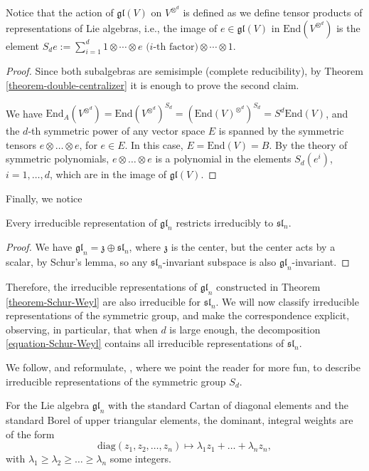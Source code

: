 Notice that the action of $\mathfrak{gl}(V)$ on $V^{\otimes^d}$ is defined as we define tensor products of representations of Lie algebras, i.e., the image of $e\in \mathfrak{gl}(V)$ in $\text{End}(V^{\otimes^d})$ is the element $S_d e:=\sum_{i=1}^d 1\otimes\cdots\otimes e \mbox{ ($i$-th factor)} \otimes \cdots\otimes 1$.

\begin{proof}
 Since both subalgebras are semisimple (complete reducibility), by Theorem \ref{theorem-double-centralizer} it is enough to prove the second claim.

 We have $\text{End}_A(V^{\otimes^d}) = \text{End}(V^{\otimes^d})^{S_d} = (\text{End}(V)^{\otimes^d})^{S_d} = S^d \text{End}(V)$, and the $d$-th symmetric power of any vector space $E$ is spanned by the symmetric tensors $e\otimes \dots \otimes e$, for $e\in E$. In this case, $E=\text{End}(V)=B$. By the theory of symmetric polynomials, $e\otimes \dots \otimes e$ is a polynomial in the elements $S_d(e^i)$, $i=1,\dots, d$, which are in the image of $\mathfrak{gl}(V)$.
\end{proof}


Finally, we notice

\begin{lemma}
\label{lemma-restriction-sl}
Every irreducible representation of $\mathfrak{gl}_n$ restricts irreducibly to $\mathfrak{sl}_n$.
\end{lemma}

\begin{proof}
 We have $\mathfrak{gl}_n = \mathfrak z \oplus \mathfrak{sl}_n$, where $\mathfrak z$ is the center, but the center acts by a scalar, by Schur's lemma, so any $\mathfrak{sl}_n$-invariant subspace is also $\mathfrak{gl}_n$-invariant.
\end{proof}

Therefore, the irreducible representations of $\mathfrak{gl}_n$ constructed in Theorem \ref{theorem-Schur-Weyl} are also irreducible for $\mathfrak{sl}_n$. We will now classify irreducible representations of the symmetric group, and make the correspondence explicit, observing, in particular, that when $d$ is large enough, the decomposition \ref{equation-Schur-Weyl} contains all irreducible representations of $\mathfrak{sl}_n$.


We follow, and reformulate, \cite{Fulton-Harris}, where we point the reader for more fun, to describe irreducible representations of the symmetric group $S_d$. 

For the Lie algebra $\mathfrak{gl}_n$ with the standard Cartan of diagonal elements and the standard Borel of upper triangular elements, the dominant, integral weights are of the form
$$ \text{diag}(z_1, z_2, \dots, z_n)\mapsto \lambda_1 z_1 + \dots +\lambda_n z_n,$$
with $\lambda_1\ge \lambda_2\ge \dots \ge \lambda_n$ some integers. 

